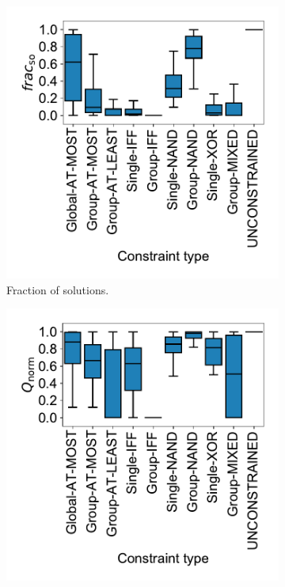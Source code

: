 \begin{figure}[t]
	\centering
	\begin{subfigure}{0.48\textwidth}
		\centering
		\includegraphics[width=\textwidth, trim=20 15 15 15, clip]{plots/syn-constraint-type-vs-solutions.pdf}
		\caption{Fraction of solutions.}
		\label{fig:syn:constraint-type-vs-solutions}
	\end{subfigure}
	\hfill
	\begin{subfigure}{0.48\textwidth}
		\centering
		\includegraphics[width=\textwidth, trim=20 15 15 15, clip]{plots/syn-constraint-type-vs-objective.pdf}

\end{subfigure}
\end{figure}
